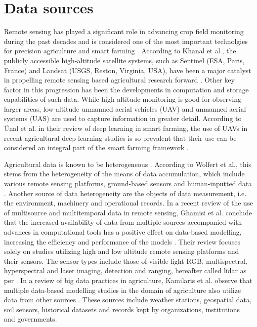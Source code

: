 \section{Data sources}
\label{sec:data-sources-review}

Remote sensing has played a significant role in advancing crop field monitoring during the past decades and is considered one of the most important technolgies for precision agriculture and smart farming \cite{Tsouros2019}. According to Khanal et al., the publicly accessible high-altitude satellite systems, such as Sentinel (ESA, Paris, France) and Landsat (USGS, Reston, Virginia, USA), have been a major catalyst in propelling remote sensing based agricultural research forward \cite{Khanal2020}. Other key factor in this progression has been the developments in computation and storage capabilities of such data. While high altitude monitoring is good for observing larger areas, low-altitude unmanned aerial vehicles (UAV) and unmanned aerial systems (UAS) are used to capture information in greater detail. According to {\"{U}}nal et al. in their review of deep learning in smart farming, the use of UAVs in recent agricultural deep learning studies is so prevalent that their use can be considered an integral part of the smart farming framework \cite{Unal2020}.  

Agricultural data is known to be heterogeneous \cite{Kamilaris2017}. According to Wolfert et al., this stems from the heterogeneity of the means of data accumulation, which include various remote sensing platforms, ground-based sensors and human-inputted data \cite{Wolfert2017d}. Another source of data heterogeneity are the objects of data measurement, i.e. the environment, machinery and operational records. In a recent review of the use of multisource and multitemporal data in remote sensing, Ghamisi et al. conclude that the increased availability of data from multiple sources accompanied with advances in computational tools has a positive effect on data-based modelling, increasing the efficiency and performance of the models \cite{Ghamisi2019}. Their review focuses solely on studies utilizing high and low altitude remote sensing platforms and their sensors. The sensor types include those of visible light RGB, multispectral, hyperspectral and laser imaging, detection and ranging, hereafter called lidar as per \cite{Ghamisi2019}. In a review of big data practices in agriculture, Kamilaris et al. observe that multiple data-based modelling studies in the domain of agriculture also utilize data from other sources \cite{Kamilaris2017}. These sources include weather stations, geospatial data, soil sensors, historical datasets and records kept by organizations, institutions and governments. 



